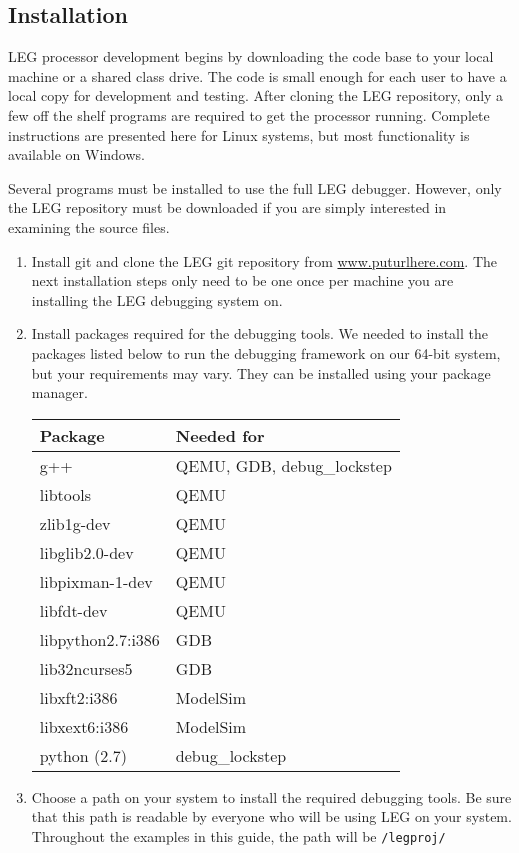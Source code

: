 \subsection{Installation}
LEG processor development begins by downloading the code base to your local machine or a shared class drive.
The code is small enough for each user to have a local copy for development and testing.
After cloning the LEG repository, only a few off the shelf programs are required to get the processor running.
Complete instructions are presented here for Linux systems, but most functionality is available on Windows.

Several programs must be installed to use the full LEG debugger. 
However, only the LEG repository must be downloaded if you are simply interested in examining the source files.

\begin{enumerate}
\item Install git and clone the LEG git repository from \url{www.puturlhere.com}. 
The next installation steps only need to be one once per machine you are installing the LEG debugging system on.

\item Install packages required for the debugging tools. We needed to install the packages listed below to run the debugging framework on our 64-bit system, but your requirements may vary.
They can be installed using your package manager.

\begin{tabular}{|l|l|}
\hline 
\textbf{Package} & \textbf{Needed for} \\\hline
g++ & QEMU, GDB, debug\_lockstep \\\hline
libtools & QEMU \\\hline
zlib1g-dev & QEMU \\\hline
libglib2.0-dev & QEMU \\\hline
libpixman-1-dev & QEMU \\\hline
libfdt-dev & QEMU \\\hline
libpython2.7:i386 & GDB \\\hline
lib32ncurses5 & GDB \\\hline
libxft2:i386 & ModelSim \\\hline
libxext6:i386 & ModelSim \\\hline
python (2.7)& debug\_lockstep \\\hline
\end{tabular}

\item Choose a path on your system to install the required debugging tools. 
Be sure that this path is readable by everyone who will be using LEG on your system.
Throughout the examples in this guide, the path will be \texttt{/legproj/}


\end{enumerate}
